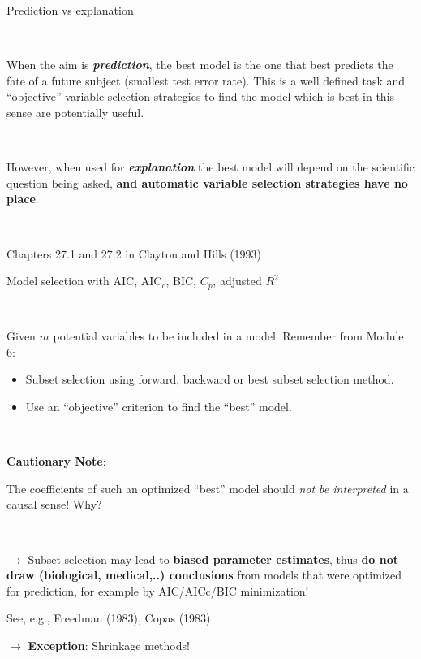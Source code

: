 \documentclass[10pt,ignorenonframetext,]{beamer}
\begin{document}
\begin{frame}

\begin{block}{Prediction vs explanation}

\(~\)

When the aim is \textbf{\emph{prediction}}, the best model is the one
that best predicts the fate of a future subject (smallest test error
rate). This is a well defined task and ``objective'' variable selection
strategies to find the model which is best in this sense are potentially
useful.

\(~\)

However, when used for \textbf{\emph{explanation}} the best model will
depend on the scientific question being asked, \textbf{and automatic
variable selection strategies have no place}.

\(~\)

\scriptsize

Chapters 27.1 and 27.2 in Clayton and Hills (1993)

\end{block}

\end{frame}

\begin{frame}

\begin{block}{Model selection with AIC, AIC\(_c\), BIC, \(C_p\),
adjusted \(R^2\)}

\(~\)

Given \(m\) potential variables to be included in a model. Remember from
Module 6: \vspace{2mm}

\begin{itemize}
\item
  Subset selection using forward, backward or best subset selection
  method.
\item
  Use an ``objective'' criterion to find the ``best'' model.
\end{itemize}

\(~\)

\textbf{Cautionary Note}:

The coefficients of such an optimized ``best'' model should \emph{not be
interpreted} in a causal sense! Why?

\(~\)

\(\rightarrow\) Subset selection may lead to \textbf{biased parameter
estimates}, thus \textbf{do not draw (biological, medical,..)
conclusions} from models that were optimized for prediction, for example
by AIC/AICc/BIC minimization!

\vspace{1mm}
\scriptsize

See, e.g., Freedman (1983), Copas (1983)

\vspace{2mm}
\normalsize

\(\rightarrow\) \textbf{Exception}: Shrinkage methods!

\end{block}

\end{frame}
\end{document}
